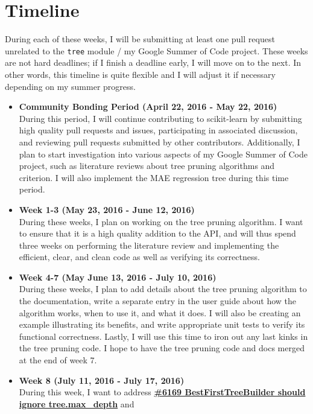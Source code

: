 \documentclass[12pt, oneside]{article}
\begin{document}
\section{Timeline}
During each of these weeks, I will be submitting at least one pull
request unrelated to the \texttt{tree} module / my Google Summer of Code project. These
weeks are not hard deadlines; if I finish a deadline early, I will
move on to the next. In other words, this timeline is quite flexible
and I will adjust it if necessary depending on my summer progress.
\begin{itemize}
  \item 
  \textbf{Community Bonding Period (April 22, 2016 - May 22,
    2016)}\\
  During this period, I will continue contributing to
  scikit-learn by submitting high quality pull requests and issues,
  participating in associated discussion, and reviewing pull requests
  submitted by other contributors. Additionally, I plan to start
  investigation into various aspects of my Google Summer of Code
  project, such as literature reviews about tree pruning algorithms
  and criterion. I will also implement the MAE regression tree during
  this time period.
  \item
  \textbf{Week 1-3 (May 23, 2016 - June 12, 2016)}\\
  During these weeks, I plan on working on the tree pruning
  algorithm. I want to ensure that it is a high quality addition to
  the API, and will thus spend three weeks on performing the
  literature review and implementing the efficient, clear, and clean
  code as well as verifying its correctness.
  \item
  \textbf{Week 4-7 (May June 13, 2016 - July 10, 2016)}\\
  During these weeks, I plan to add details about the tree
  pruning algorithm to the documentation, write a separate entry in
  the user guide about how the algorithm works, when to use it, and
  what it does. I will also be creating an example illustrating its
  benefits, and write appropriate unit tests to verify its functional
  correctness. Lastly, I will use this time to iron out any last kinks
  in the tree pruning code. I hope to have the tree pruning code and
  docs merged at the end of week 7.
  \item
  \textbf{Week 8 (July 11, 2016 - July 17, 2016)}\\
  During this week, I want to address
  \textbf{\href{https://github.com/scikit-learn/scikit-learn/pull/6169}
    {\#6169 BestFirstTreeBuilder should ignore tree.max\_depth}} and

\end{itemize}
\end{document}
